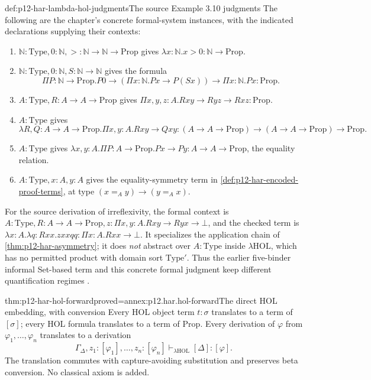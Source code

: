 \begin{hbexample}{def:p12-har-lambda-hol-judgments}{The source Example 3.10 judgments}
The following are the chapter's concrete formal-system instances, with
the indicated declarations supplying their contexts:
\begin{enumerate}
 \item \(\mathbb N:\mathrm{Type},0:\mathbb N,
 >:\mathbb N\to\mathbb N\to\mathrm{Prop}\) gives
 \(\lambda x:\mathbb N.x>0:\mathbb N\to\mathrm{Prop}\).
 \item \(\mathbb N:\mathrm{Type},0:\mathbb N,
 S:\mathbb N\to\mathbb N\) gives the formula
 \[
 \Pi P:\mathbb N\to\mathrm{Prop}.
 P0\to(\Pi x:\mathbb N.Px\to P(Sx))
       \to\Pi x:\mathbb N.Px:\mathrm{Prop}.
 \]
 \item \(A:\mathrm{Type},R:A\to A\to\mathrm{Prop}\) gives
 \(\Pi x,y,z:A.Rxy\to Ryz\to Rxz:\mathrm{Prop}\).
 \item \(A:\mathrm{Type}\) gives
 \[
 \lambda R,Q:A\to A\to\mathrm{Prop}.
       \Pi x,y:A.Rxy\to Qxy
       :(A\to A\to\mathrm{Prop})\to
        (A\to A\to\mathrm{Prop})\to\mathrm{Prop}.
 \]
 \item \(A:\mathrm{Type}\) gives
 \(\lambda x,y:A.\Pi P:A\to\mathrm{Prop}.Px\to Py
       :A\to A\to\mathrm{Prop}\), the equality relation.
 \item \(A:\mathrm{Type},x:A,y:A\) gives the equality-symmetry
 term in \cref{def:p12-har-encoded-proof-terms}, at type
 \((x=_A y)\to(y=_A x)\).
\end{enumerate}
For the source derivation of irreflexivity, the formal context is
\(A:\mathrm{Type},R:A\to A\to\mathrm{Prop},
z:\Pi x,y:A.Rxy\to Ryx\to\bot\), and the checked term is
\(\lambda x:A.\lambda q:Rxx.zxxqq:
\Pi x:A.Rxx\to\bot\). It specializes the application chain of
\cref{thm:p12-har-asymmetry}; it does \emph{not} abstract over
\(A:\mathrm{Type}\) inside \(\lambda\mathrm{HOL}\), which
has no permitted product with domain sort \(\mathrm{Type}'\).
Thus the earlier five-binder informal Set-based term and this concrete
formal judgment keep different quantification regimes
\cite[pp.~1187--1189, Example~3.10]{BarendregtGeuvers2001}.
\end{hbexample}

\begin{hbtheorem}{thm:p12-har-hol-forward}{proved=annex:p12.har.hol-forward}{The direct HOL embedding, with conversion}
Every HOL object term \(t:\sigma\) translates to a term of
\([\sigma]\); every HOL formula translates to a term of
\(\mathrm{Prop}\). Every derivation of \(\varphi\) from
\(\varphi_1,\ldots,\varphi_n\) translates to a derivation
\[
 \Gamma_\Delta,z_1:[\varphi_1],\ldots,z_n:[\varphi_n]
       \vdash_{\lambda\mathrm{HOL}}[\Delta]:[\varphi].
\]
The translation commutes with capture-avoiding substitution and preserves
beta conversion. No classical axiom is added.
\end{hbtheorem}

